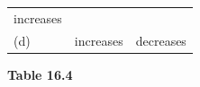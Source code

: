 \begin{enumerate}[noitemsep, label=\textbf{\arabic*}. ]
\begin{enumerate}[noitemsep, label=\textbf{\alph*}. ]
{{\begin{center}
\begin{tabular}[t]{|l|l|l|}
        increases%
     \tabularnewline\cline{1-1}\cline{2-2}\cline{3-3}
    
    
        (d) &
    
    
        increases &
    
    
        decreases%
     \tabularnewline\cline{1-1}\cline{2-2}\cline{3-3}
    \end{tabular}
      \end{center}
    \begin{center}{\small\bfseries Table 16.4}\end{center}
    
    \addtocounter{footnote}{-0}
    
          }{ %
        
    
        \begin{center}
      
      \label{m38776*id68590}
      
    \noindent
      \tablelasttail{}
      \begin{xtabular}[t]{|l|l|l|}\hline
    

\end{xtabular}
\end{center}}}
\end{enumerate}
\end{enumerate}
